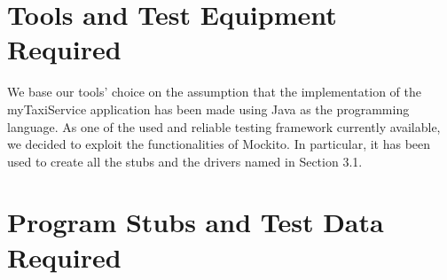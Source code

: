 \documentclass{article}
\begin{document}
\section{Tools and Test Equipment Required}
We base our tools' choice on the assumption that
the implementation of the myTaxiService application
has been made using Java as the programming language.
As one of the used and reliable testing framework
currently available, we decided to exploit the
functionalities of Mockito. In particular, it
has been used to create all the stubs and the drivers
named in Section 3.1.
\section{Program Stubs and Test Data Required}
\end{document}
